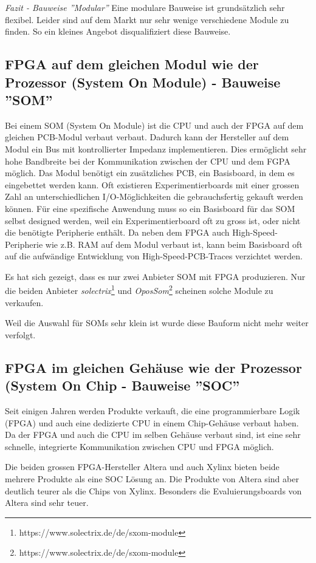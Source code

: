 \textit{Fazit - Bauweise ''Modular''}
Eine modulare Bauweise ist grundsätzlich sehr flexibel.
Leider sind auf dem Markt nur sehr wenige verschiedene Module zu finden.
So ein kleines Angebot disqualifiziert diese Bauweise.


\subsection{FPGA auf dem gleichen Modul wie der Prozessor (System On Module) - Bauweise ''SOM''}
Bei einem SOM (System On Module) ist die CPU und auch der FPGA auf dem gleichen PCB-Modul verbaut verbaut.
Dadurch kann der Hersteller auf dem Modul ein Bus mit kontrollierter Impedanz implementieren.
Dies ermöglicht sehr hohe Bandbreite bei der Kommunikation zwischen der CPU und dem FGPA möglich.
Das Modul benötigt ein zusätzliches PCB, ein Basisboard, in dem es eingebettet werden kann.
Oft existieren Experimentierboards mit einer grossen Zahl an unterschiedlichen I/O-Möglichkeiten die gebrauchsfertig gekauft werden können.
Für eine spezifische Anwendung muss so ein Basisboard für das SOM selbst designed werden, weil ein Experimentierboard oft zu gross ist, oder nicht die benötigte Peripherie enthält.
Da neben dem FPGA auch High-Speed-Peripherie wie z.B. RAM auf dem Modul verbaut ist, kann beim Basisboard oft auf die aufwändige Entwicklung von High-Speed-PCB-Traces verzichtet werden.

Es hat sich gezeigt, dass es nur zwei Anbieter SOM mit FPGA produzieren.
Nur die beiden Anbieter \textit{solectrix}\footnote{https://www.solectrix.de/de/sxom-module} und \textit{OposSom}\footnote{https://www.solectrix.de/de/sxom-module} scheinen solche Module zu verkaufen.

Weil die Auswahl für SOMs sehr klein ist wurde diese Bauform nicht mehr weiter verfolgt.

 
\subsection{FPGA im gleichen Gehäuse wie der Prozessor (System On Chip - Bauweise ''SOC''}
Seit einigen Jahren werden Produkte verkauft, die eine programmierbare Logik (FPGA) und auch eine dedizierte CPU in einem Chip-Gehäuse verbaut haben.
Da der FPGA und auch die CPU im selben Gehäuse verbaut sind, ist eine sehr schnelle, integrierte Kommunikation zwischen CPU und FPGA möglich.

Die beiden grossen FPGA-Hersteller Altera und auch Xylinx bieten beide mehrere Produkte als eine SOC Lösung an.
Die Produkte von Altera sind aber deutlich teurer als die Chips von Xylinx.
Besonders die Evaluierungsboards von Altera sind sehr teuer.

